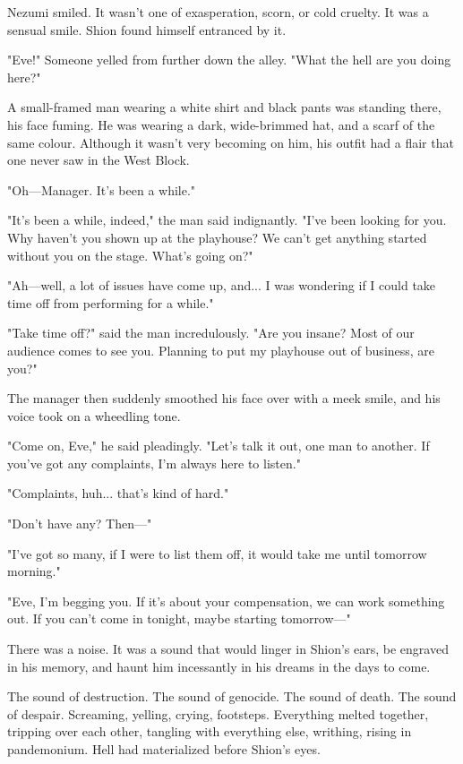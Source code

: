 Nezumi smiled. It wasn't one of exasperation, scorn, or cold cruelty. It
was a sensual smile. Shion found himself entranced by it.

"Eve!" Someone yelled from further down the alley. "What the hell are
you doing here?"

A small-framed man wearing a white shirt and black pants was standing
there, his face fuming. He was wearing a dark, wide-brimmed hat, and a
scarf of the same colour. Although it wasn't very becoming on him, his
outfit had a flair that one never saw in the West Block.

"Oh---Manager. It's been a while."

"It's been a while, indeed," the man said indignantly. "I've been
looking for you. Why haven't you shown up at the playhouse? We can't get
anything started without you on the stage. What's going on?"

"Ah---well, a lot of issues have come up, and... I was wondering if I
could take time off from performing for a while."

"Take time off?" said the man incredulously. "Are you insane? Most of
our audience comes to see you. Planning to put my playhouse out of
business, are you?"

The manager then suddenly smoothed his face over with a meek smile, and
his voice took on a wheedling tone.

"Come on, Eve," he said pleadingly. "Let's talk it out, one man to
another. If you've got any complaints, I'm always here to listen."

"Complaints, huh... that's kind of hard."

"Don't have any? Then---"

"I've got so many, if I were to list them off, it would take me until
tomorrow morning."

"Eve, I'm begging you. If it's about your compensation, we can work
something out. If you can't come in tonight, maybe starting tomorrow---"

There was a noise. It was a sound that would linger in Shion's ears, be
engraved in his memory, and haunt him incessantly in his dreams in the
days to come.

The sound of destruction. The sound of genocide. The sound of death. The
sound of despair. Screaming, yelling, crying, footsteps. Everything
melted together, tripping over each other, tangling with everything
else, writhing, rising in pandemonium. Hell had materialized before
Shion's eyes.

